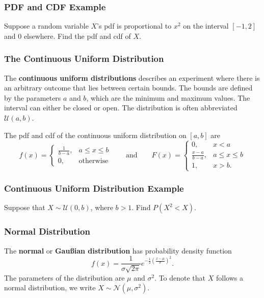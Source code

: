 \documentclass{beamer}
\begin{document}
\begin{frame}[t]
\frametitle{PDF and CDF Example}
\begin{Example}
Suppose a random variable $X$'s pdf is proportional to $x^2$ on the interval $[-1, 2]$ and 0 elsewhere. Find the pdf and cdf of $X$.
\end{Example}

\end{frame}

\begin{frame}
\frametitle{The Continuous Uniform Distribution} 
\small 
\begin{Definition}
The {\bf continuous uniform distributions} describes an experiment where there is an arbitrary outcome that lies between certain bounds. The bounds are defined by the parameters $a$ and $b$, which are the minimum and maximum values. The interval can either be closed or open. The distribution is often abbreviated $\mathcal{U}(a, b)$. 
\end{Definition}
The pdf and cdf of the continuous uniform distribution on $[a, b]$ are
$$
f(x) = \begin{cases} \displaystyle\frac{1}{b - a},	&	a\leq x\leq b\\ 0, & \text{otherwise}\end{cases}\qquad\text{and}\qquad F(x) = \begin{cases} 0,	&	x < a\\ \displaystyle\frac{x - a}{b - a}, & 	a\leq x\leq b\\	1,	&	x > b.\end{cases}
$$
\end{frame}

\begin{frame}[t]
\frametitle{Continuous Uniform Distribution Example}
\begin{Example}
Suppose that $X\sim{\mathcal{U}(0, b)}$, where $b > 1$. Find $P(X^2 < X)$.
\end{Example}

\end{frame}

\begin{frame}
\frametitle{Normal Distribution}
\begin{Definition}
The {\bf normal} or {\bf Gau{\ss}ian distribution} has probability density function 
$$
\displaystyle f(x) = \frac{1}{\sigma \sqrt{2\pi}} e^{-\frac{1}{2}\left(\frac{x - \mu}{\sigma}\right)^2}.
$$
The parameters of the distribution are $\mu$ and $\sigma^2$. To denote that $X$ follows a normal distribution, we write $X\sim{\mathcal{N}(\mu, \sigma^2)}$.
\end{Definition} 
\end{frame}
\end{document}
